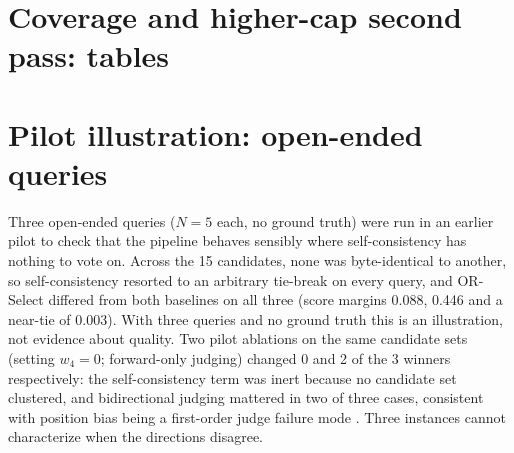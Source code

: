 \section{Coverage and higher-cap second pass: tables}
\label{sec:s-coverage}

\begin{table}[htbp]
\centering
\caption{Coverage by track. Truncated: no valid answer after resampling
because generation hit the output cap. Other: failed for another reason.
Untried: not attempted. With Laguna: graded heterogeneous
problems that still contain Laguna-S candidates.}
\label{tab:coverage}
\small\setlength{\tabcolsep}{4pt}
\end{table}

\begin{table}[htbp]
\centering
\caption{Effect of the flagged second pass. Main protocol: problems that
completed under the 32{,}768-token cap. Rescued: problems completed only
under the higher cap. Final: all graded problems.}
\label{tab:extended}
\small\setlength{\tabcolsep}{4pt}
\end{table}


\section{Pilot illustration: open-ended queries}
\label{sec:pilot}

Three open-ended queries ($N=5$ each, no ground truth) were run in an
earlier pilot to check that the pipeline behaves sensibly where
self-consistency has nothing to vote on. Across the 15 candidates, none was
byte-identical to another, so self-consistency resorted to an arbitrary
tie-break on every query, and OR-Select differed from both baselines on all
three (score margins 0.088, 0.446 and a near-tie of 0.003). With three
queries and no ground truth this is an illustration, not evidence about
quality. Two pilot ablations on the same candidate sets (setting $w_4=0$;
forward-only judging) changed 0 and 2 of the 3 winners respectively: the
self-consistency term was inert because no candidate set clustered, and
bidirectional judging mattered in two of three cases, consistent with
position bias being a first-order judge failure mode
\citep{zheng2023judging,tang2024permutation,wang2023notfair}. Three
instances cannot characterize when the directions disagree.


